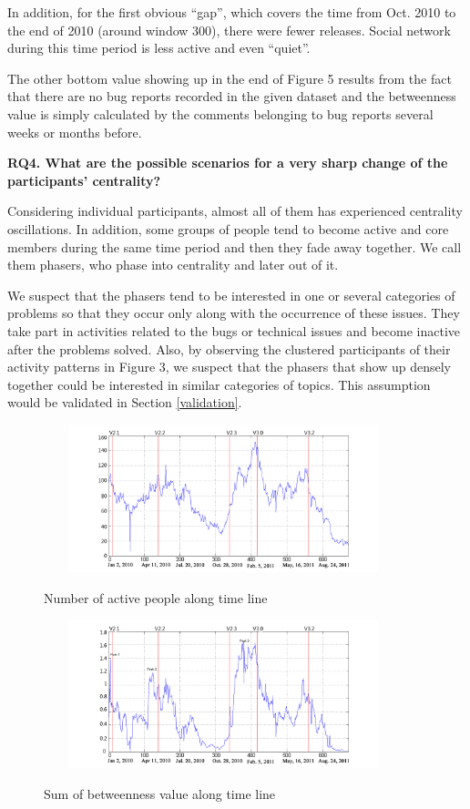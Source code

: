 \documentclass[10pt, conference, compsocconf]{IEEEtran}
\begin{document}
In addition, for the first obvious  \textquotedblleft gap\textquotedblright, which covers the time from Oct. 2010 to the end of 2010 (around window 300), there were fewer releases. Social network during this time period is less active and even \textquotedblleft quiet\textquotedblright.

The other bottom value showing up in the end of Figure 5 results from the fact that there are no bug reports recorded in the given dataset and the betweenness value is simply calculated by the comments belonging to bug reports several weeks or months before. 

\textbf{RQ4. What are the possible scenarios for a very sharp change of the participants' centrality?}

Considering individual participants, almost all of them has experienced centrality oscillations. In addition, some groups of people tend to become active and core members during the same time period and then they fade away together. We call them phasers, who phase into centrality and later out of it.

We suspect that the phasers tend to be interested in one or several categories of problems so that they occur only along with the occurrence of these issues. They take part in activities related to the bugs or technical issues and become inactive after the problems solved. Also, by observing the clustered participants of their activity patterns in Figure 3, we suspect that the phasers that show up densely together could be interested in similar categories of topics. This assumption would be validated in Section \ref{validation}. 

\begin{figure}[!t]
\centerline{\includegraphics[width=4.1in, height = 4.3cm]{people.png}
\label{people}}
\caption{Number of active people along time line}
\end{figure}

\begin{figure}[!t]
\centerline{\includegraphics[width=4.1in, height = 4.3cm]{betweenness.png}
\label{betweenness}}
\caption{Sum of betweenness value along time line}
\end{figure}
\end{document}
